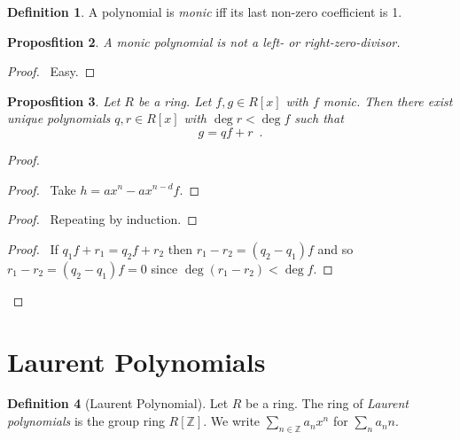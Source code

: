 \documentclass{book}
\let\qed\relax
\newtheorem{prop}{Proposfition}[chapter]
\theoremstyle{definition}
\newtheorem{df}[prop]{Definition}
\begin{document}
\begin{df}
A polynomial is \emph{monic} iff its last non-zero coefficient is 1.
\end{df}

\begin{prop}
A monic polynomial is not a left- or right-zero-divisor.
\end{prop}

\begin{proof}
\pf\ Easy. \qed
\end{proof}

\begin{prop}
Let $R$ be a ring. Let $f,g \in R[x]$ with $f$ monic. Then there exist unique polynomials $q,r \in R[x]$ with $\deg r < \deg f$ such that
\[ g = qf + r \enspace . \]
\end{prop}

\begin{proof}
\pf
{}
\begin{proof}
\pf\ Take $h = ax^n - ax^{n-d}f$.
\end{proof}
\begin{proof}
\pf\ Repeating  by induction.
\end{proof}
\begin{proof}
\pf\ If $q_1 f + r_1 = q_2 f + r_2$ then $r_1 - r_2 = (q_2 - q_1)f$ and so $r_1 - r_2 = (q_2 - q_1) f = 0$ since $\deg (r_1 - r_2) < \deg f$.
\end{proof}
\qed
\end{proof}

\section{Laurent Polynomials}

\begin{df}[Laurent Polynomial]
Let $R$ be a ring. The ring of \emph{Laurent polynomials} is the group ring $R[\mathbb{Z}]$. We write $\sum_{n \in \mathbb{Z}} a_n x^{n}$ for $\sum_n a_n n$.
\end{df}
\end{document}
